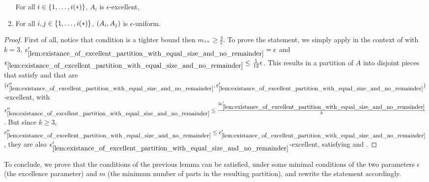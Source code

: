 \begin{lemma}[Corollary 5.15]
\begin{enumerate}[label=(\roman*), ref=\roman*]
                    For all $i \in \{ 1, \dots, i(*) \}$, $A_i$ is $\epsilon$-excellent,
                \item \label{itm:resume_of_all_conditions_for_excellent_partitions.iii}
                    For all $i, j \in \{ 1, \dots, i(*) \}$, $( A_i, A_j )$ is $\epsilon$-uniform.
            \end{enumerate}
            \begin{proof}
                First of all, notice that condition 
                is a tighter bound then $m_{**} \geq \frac{3}{\epsilon}$.
                To prove the statement, we simply apply 
                in the context of  with $k = 3$,
                ${\epsilon'_{\ref{lem:existance_of_excellent_partition_with_equal_size_and_no_remainder}}} = \epsilon$
                and ${\epsilon_{\ref{lem:existance_of_excellent_partition_with_equal_size_and_no_remainder}}} \leq \frac{1}{12} \epsilon$.
                This results in a partition of $A$ into disjoint pieces that satisfy
                 and that are
                $( {\epsilon''_{\ref{lem:existance_of_excellent_partition_with_equal_size_and_no_remainder}}},
                    \epsilon'_{\ref{lem:existance_of_excellent_partition_with_equal_size_and_no_remainder}} )$-excellent,
                with ${\epsilon''_{\ref{lem:existance_of_excellent_partition_with_equal_size_and_no_remainder}}} \leq
                    \frac{3 \epsilon'_{\ref{lem:existance_of_excellent_partition_with_equal_size_and_no_remainder}}}{k}$.
                But since $k \geq 3$, ${\epsilon''_{\ref{lem:existance_of_excellent_partition_with_equal_size_and_no_remainder}}} \leq
                    \epsilon'_{\ref{lem:existance_of_excellent_partition_with_equal_size_and_no_remainder}}$, they are also
                $\epsilon'_{\ref{lem:existance_of_excellent_partition_with_equal_size_and_no_remainder}}$-excellent, satisfying
                 and
                .
            \end{proof}
        \end{lemma}

        To conclude, we prove that the conditions of the previous lemma can be satisfied, under some minimal conditions
        of the two parameters $\epsilon$ (the excellence parameter) and $m$ (the minimum number of parts in the resulting
        partition), and rewrite the statement accordingly.

